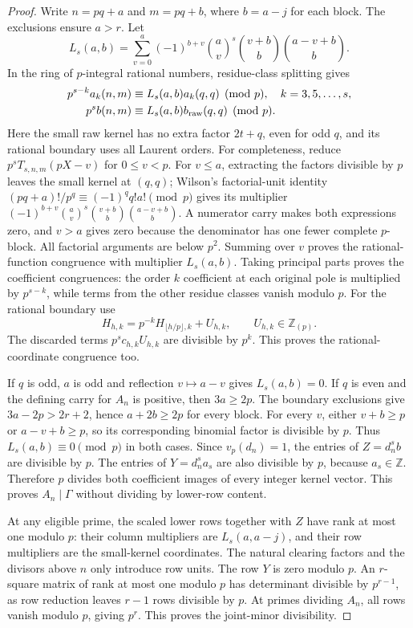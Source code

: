 \documentclass[11pt]{article}
\theoremstyle{remark}
\newcommand{\Z}{\mathbb Z}
\begin{document}
\begin{proof}
Write \(n=pq+a\) and \(m=pq+b\), where \(b=a-j\) for each block.
The exclusions ensure \(a>r\). Let
\[
 L_s(a,b)=\sum_{v=0}^a(-1)^{b+v}\binom av^s
                 \binom{v+b}b\binom{a-v+b}b.
\]
In the ring of \(p\)-integral rational numbers, residue-class splitting
gives
\begin{align*}
 p^{s-k}a_k(n,m)&\equiv L_s(a,b)a_k(q,q)\pmod p,\quad k=3,5,\ldots,s,\\
 p^sb(n,m)&\equiv L_s(a,b)b_{\rm raw}(q,q)\pmod p.
\end{align*}
Here the small raw kernel has no extra factor \(2t+q\), even for odd
\(q\), and its rational boundary uses all Laurent orders.
For completeness, reduce \(p^sT_{s,n,m}(pX-v)\) for \(0\le v<p\).
For \(v\le a\), extracting the factors divisible by \(p\) leaves
the small kernel at \((q,q)\); Wilson's factorial-unit identity
\((pq+a)!/p^q\equiv(-1)^qq!a!\pmod p\) gives its multiplier
\((-1)^{b+v}\binom av^s\binom{v+b}b\binom{a-v+b}b\).
A numerator carry makes both expressions zero, and \(v>a\) gives
zero because the denominator has one fewer complete \(p\)-block.
All factorial arguments are below \(p^2\). Summing over \(v\)
proves the rational-function congruence with multiplier \(L_s(a,b)\).
Taking principal parts proves the coefficient congruences: the order
\(k\) coefficient at each original pole is multiplied by \(p^{s-k}\),
while terms from the other residue classes vanish modulo \(p\).
For the rational boundary use
\[
 H_{h,k}=p^{-k}H_{\lfloor h/p\rfloor,k}+U_{h,k},
 \qquad U_{h,k}\in\Z_{(p)}.
\]
The discarded terms \(p^sc_{h,k}U_{h,k}\) are divisible by \(p^k\).
This proves the rational-coordinate congruence too.

If \(q\) is odd, \(a\) is odd and reflection \(v\mapsto a-v\)
gives \(L_s(a,b)=0\). If \(q\) is even and the defining carry for
\(A_n\) is positive, then \(3a\ge2p\). The boundary exclusions
give \(3a-2p>2r+2\), hence \(a+2b\ge2p\) for every block.
For every \(v\), either \(v+b\ge p\) or \(a-v+b\ge p\), so its
corresponding binomial factor is divisible by \(p\). Thus
\(L_s(a,b)\equiv0\pmod p\) in both cases.
Since \(v_p(d_n)=1\), the entries of \(Z=d_n^sb\) are divisible
by \(p\). The entries of \(Y=d_n^sa_s\) are also divisible by
\(p\), because \(a_s\in\Z\). Therefore \(p\) divides both
coefficient images of every integer kernel vector. This proves
\(A_n\mid\Gamma\) without dividing by lower-row content.

At any eligible prime, the scaled lower rows together with \(Z\)
have rank at most one modulo \(p\): their column multipliers are
\(L_s(a,a-j)\), and their row multipliers are the small-kernel
coordinates. The natural clearing factors and the divisors above
\(n\) only introduce row units. The row \(Y\) is zero modulo \(p\).
An \(r\)-square matrix of rank at most one modulo \(p\) has
determinant divisible by \(p^{r-1}\), as row reduction leaves
\(r-1\) rows divisible by \(p\). At primes dividing \(A_n\),
all rows vanish modulo \(p\), giving \(p^r\). This proves the
joint-minor divisibility.


\end{proof}
\end{document}
